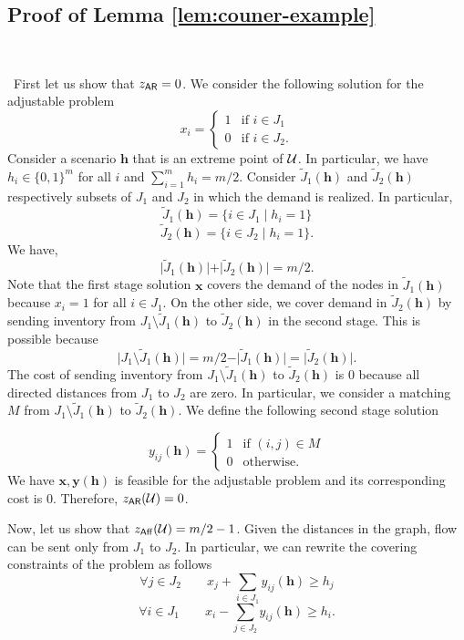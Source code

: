 \documentclass[moor]{informs1}              %
\newcommand{\mb}[1]{\ensuremath{\boldsymbol{#1}}}
\begin{document}
\begin{APPENDICES}
\section{Proof of Lemma \ref{lem:couner-example}} \label{apx-lem:couner-example}


\

\
First let us show that $z_{\sf AR}= 0$.
We consider the following solution for the  adjustable problem  
$$
x_i= \left\{
    \begin{array}{ll}
        1 & \mbox{if } i \in J_1 \\
        0 & \mbox{if }  i \in J_2.
    \end{array}
\right.
$$
Consider a scenario $\mb h $ that is an extreme point of $  {\cal U}$. In particular, we have  $h_i \in \{0,1\}^m$ for all $i$ and $\sum_{i=1}^m h_i = m/2$. Consider $\tilde{J}_1(\mb h )$ and $\tilde{J}_2(\mb h )$   respectively subsets of $ J_1 $  and $  J_2 $ in  which the demand is realized. In particular,
$$ \tilde{J}_1( \mb h)= \{ i \in J_1 \; \vert \; h_i =1 \} $$
$$ \tilde{J}_2 ( \mb h)= \{ i \in J_2 \; \vert \; h_i =1 \}.$$
We have, $$ \vert \tilde{J}_1 (\mb h) \vert +  \vert \tilde{J}_2 (\mb h ) \vert  = m/2 .$$  
Note that the first stage solution $\mb x$ covers the demand of the nodes in $ \tilde{J}_1 ( \mb h)$ because $x_i=1$ for all $i \in J_1$. On the other side, we cover demand  in $ \tilde{J}_2 ( \mb h)$ by sending inventory from $J_1 \setminus  \tilde{J}_1(\mb h) $ to $ \tilde{J}_2 ( \mb h) $ in the second stage. This is possible because
$$ \vert J_1 \setminus  \tilde{J}_1(\mb h) \vert = m/2 - \vert \tilde{J}_1(\mb h) \vert  =  \vert \tilde{J}_2 (\mb h) \vert . $$ The cost of sending inventory from $J_1 \setminus  \tilde{J}_1(\mb h)$  to $ \tilde{J}_2 (\mb h )$ is 0 because all directed distances from $J_1$ to $J_2$ are  zero.  In particular, we consider a matching $M$  from $J_1 \setminus  \tilde{J}_1(\mb h)$  to $ \tilde{J}_2 (\mb h )$. We define the following second stage solution

$$
y_{ij}(\mb h)= \left\{
    \begin{array}{ll}
        1 & \mbox{if } (i,j) \in M \\
        0 & \mbox{otherwise}.
    \end{array}
\right.
$$
We have $\mb x, \mb y( \mb h)$ is feasible for the adjustable problem and its corresponding cost is 0. Therefore, $ z_{\sf AR}({\cal U}) = 0$. 


Now, let us show that $ z_{\sf Aff}({\cal U}) = m/2-1$. Given the distances in the graph, flow can be sent only from $J_1$ to $J_2$. In particular, we can rewrite the covering constraints of the problem as follows
\begin{equation} \label{morocco1}
\forall j \in J_2 \qquad x_j + \sum_{i \in J_1} y_{ij} (\mb h) \geq h_j
\end{equation}
\begin{equation} \label{morocco2}
\forall i \in J_1 \qquad x_i- \sum_{j \in J_2} y_{ij} (\mb h) \geq h_i. 
\end{equation}


\end{APPENDICES}
\end{document}
